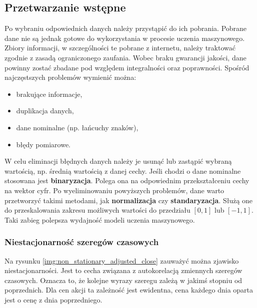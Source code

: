 \documentclass[a4paper, twoside, 11pt, openright]{article}
\begin{document}
\begin{longtable}[c]{| m{0.5cm} m{5cm} m{10cm}|}
\end{longtable}

\subsection{Przetwarzanie wstępne}

Po wybraniu odpowiednich danych należy przystąpić do ich pobrania. Pobrane dane nie są jednak gotowe do wykorzystania w procesie uczenia maszynowego. Zbiory informacji, w szczególności te pobrane z internetu, należy traktować zgodnie z zasadą ograniczonego zaufania. Wobec braku gwarancji jakości, dane powinny zostać zbadane pod względem integralności oraz poprawności. Spośród najczęstszych problemów wymienić można: 
\begin{itemize}
    \item brakujące informacje,
    \item duplikacja danych,
    \item dane nominalne (np. łańcuchy znaków),
    \item błędy pomiarowe.
\end{itemize}

W celu eliminacji błędnych danych należy je usunąć lub zastąpić wybraną wartością, np. średnią wartością z danej cechy. Jeśli chodzi o dane nominalne stosowana jest \textbf{binaryzacja}. Polega ona na odpowiednim przekształceniu cechy na wektor cyfr. Po wyeliminowaniu powyższych problemów, dane warto przetworzyć takimi metodami, jak \textbf{normalizacja} czy \textbf{standaryzacja}. Służą one do przeskalowania zakresu możliwych wartości do przedziału $[0,1]$ lub $[-1,1]$. Taki zabieg polepsza wydajność modeli uczenia maszynowego.

\bigskip

\subsubsection{Niestacjonarność szeregów czasowych}

Na rysunku \ref{img:non_stationary_adjusted_close} zauważyć można zjawisko niestacjonarności. Jest to cecha związana z autokorelacją zmiennych szeregów czasowych. Oznacza to, że kolejne wyrazy szeregu zależą w jakimś stopniu od poprzednich. Dla cen akcji ta zależność jest ewidentna, cena każdego dnia oparta jest o cenę z dnia poprzedniego. 
\end{document}
